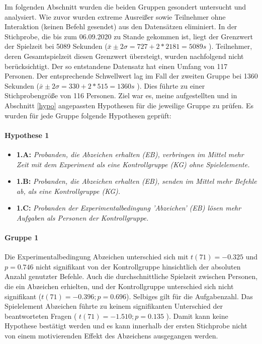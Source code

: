 Im folgenden Abschnitt wurden die beiden Gruppen gesondert untersucht und analysiert. Wie zuvor wurden extreme Ausreißer sowie Teilnehmer ohne Interaktion (keinen Befehl gesendet) aus den Datensätzen eliminiert. In der Stichprobe, die bis zum 06.09.2020 zu Stande gekommen ist, liegt der Grenzwert der Spielzeit bei 5089 Sekunden ($\bar{x}\pm 2\sigma = 727 + 2*2181 = 5089 s$ ). Teilnehmer, deren Gesamtspielzeit diesen Grenzwert übersteigt, wurden nachfolgend nicht berücksichtigt. Der so entstandene Datensatz hat einen Umfang von 117 Personen. Der entsprechende Schwellwert lag im Fall der zweiten Gruppe bei 1360 Sekunden ($\bar{x}\pm 2\sigma = 330 + 2*515 = 1360 s$ ). Dies führte zu einer Stichprobengröße von 116 Personen. Ziel war es, meine aufgestellten und in Abschnitt \ref{hypo} angepassten Hypothesen für die jeweilige Gruppe zu prüfen. Es wurden für jede Gruppe folgende Hypothesen geprüft:

\paragraph{Hypothese 1}
\begin{itemize}
    \item \textbf{1.A:} \textit{Probanden, die Abzeichen erhalten (EB), verbringen im Mittel mehr Zeit mit dem Experiment als eine Kontrollgruppe (KG) ohne Spielelemente.}
    \item \textbf{1.B:} \textit{Probanden, die Abzeichen erhalten (EB), senden im Mittel mehr Befehle ab, als eine Kontrollgruppe (KG).}
    \item \textbf{1.C:} \textit{Probanden der Experimentalbedingung 'Abzeichen' (EB) lösen mehr Aufgaben als Personen der Kontrollgruppe.} 
\end{itemize}

\paragraph{Gruppe 1}
Die Experimentalbedingung Abzeichen unterschied sich mit $ t(71)=-0.325 $ und $p=0.746$ nicht signifikant von der Kontrollgruppe hinsichtlich der absoluten Anzahl genutzter Befehle. Auch die durchschnittliche Spielzeit zwischen Personen, die ein Abzeichen erhielten, und der Kontrollgruppe unterschied sich nicht signifikant ($t(71)=-0.396; p=0.696$). Selbiges gilt für die Aufgabenzahl. Das Spielelement Abzeichen führte zu keinem signifikanten Unterschied der beantworteten Fragen ( $ t(71)=-1.510; p=0.135 $ ). Damit kann keine Hypothese bestätigt werden und es kann innerhalb der ersten Stichprobe nicht von einem motivierenden Effekt des Abzeichens ausgegangen werden.

